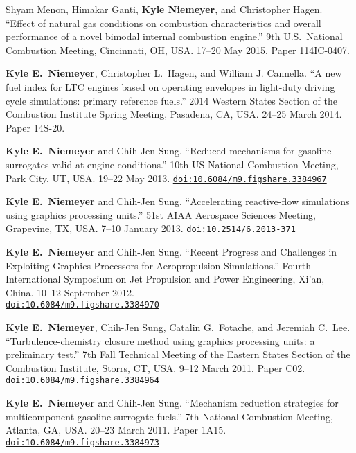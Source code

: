\documentclass[margin,line,11pt]{res}
\makeatletter
\newlength{\bibhang}
\newlength{\bibsep}
 {\@listi \global\bibsep\itemsep \global\advance\bibsep by\parsep}
\newenvironment{bibenum*}
  {\renewcommand\labelenumi{\theenumi.}%
   \etaremune[
     topsep=0pt,
     itemsep=\bibsep,
     parsep=0pt,partopsep=0pt,
     itemindent=-\bibhang,
     leftmargin={\bibhang+\widthof{[999]}}]}
  {\endetaremune}
\newcommand*{\doi}[1]{\href{http://dx.doi.org/#1}{\nolinkurl{doi:#1}}}
\makeatother
\begin{document}
\begin{resume}
\begin{bibenum*}
\item Shyam Menon, Himakar Ganti, \textbf{Kyle Niemeyer}, and Christopher Hagen.
``Effect of natural gas conditions on combustion characteristics and overall performance of a novel bimodal internal combustion engine.''
9th U.S.~National Combustion Meeting, Cincinnati, OH, USA.
17--20 May 2015.
Paper 114IC-0407.

\item \textbf{Kyle E.\ Niemeyer}, Christopher L.\ Hagen, and William J. Cannella.
``A new fuel index for LTC engines based on operating envelopes in light-duty driving cycle simulations: primary reference fuels.''
2014 Western States Section of the Combustion Institute Spring Meeting, Pasadena, CA, USA.
24--25 March 2014.
Paper 14S-20.

\item \textbf{Kyle E.\ Niemeyer} and Chih-Jen Sung.
``Reduced mechanisms for gasoline surrogates valid at engine conditions.''
10th US National Combustion Meeting, Park City, UT, USA.
19--22 May 2013.
\doi{10.6084/m9.figshare.3384967}

\item \textbf{Kyle E.\ Niemeyer} and Chih-Jen Sung.
``Accelerating reactive-flow simulations using graphics processing units.''
51st AIAA Aerospace Sciences Meeting, Grapevine, TX, USA.
7--10 January 2013.
\doi{10.2514/6.2013-371}

\item \textbf{Kyle E.\ Niemeyer} and Chih-Jen Sung.
``Recent Progress and Challenges in Exploiting Graphics Processors for Aeropropulsion Simulations.''
Fourth International Symposium on Jet Propulsion and Power Engineering, Xi'an, China.
10--12 September 2012. \\
\doi{10.6084/m9.figshare.3384970}

\item \textbf{Kyle E.\ Niemeyer}, Chih-Jen Sung, Catalin G.\ Fotache, and Jeremiah C.\ Lee.
``Turbulence-chemistry closure method using graphics processing units: a preliminary test.''
7th Fall Technical Meeting of the Eastern States Section of the Combustion Institute, Storrs, CT, USA.
9--12 March 2011.
Paper C02.
\doi{10.6084/m9.figshare.3384964}

\item \textbf{Kyle E.\ Niemeyer} and Chih-Jen Sung.
``Mechanism reduction strategies for multicomponent gasoline surrogate fuels.''
7th National Combustion Meeting, Atlanta, GA, USA.
20--23 March 2011.
Paper 1A15.
\doi{10.6084/m9.figshare.3384973}


\end{bibenum*}
\end{resume}
\end{document}
